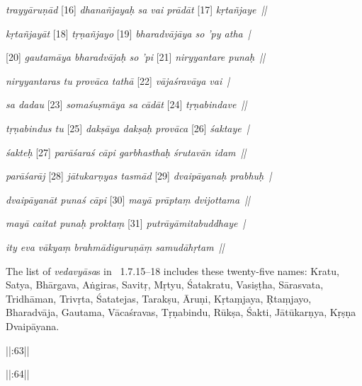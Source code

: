 {{  \textit{trayyāruṇād }[16]\textit{ dhanañjayaḥ sa vai prādāt }[17]\textit{ kṛtañjaye~|| } 
 
  \textit{kṛtañjayāt }[18]\textit{ tṛṇañjayo }[19]\textit{ bharadvājāya so 'py atha~| } 
 
  [20]\textit{ gautamāya bharadvājaḥ so 'pi }[21]\textit{ niryyantare punaḥ~|| } 
 
  \textit{niryyantaras tu provāca tathā }[22]\textit{ vājaśravāya vai~| } 
 
  \textit{sa dadau }[23]\textit{ somaśuṣmāya sa cādāt }[24]\textit{ tṛṇabindave~|| } 
 
  \textit{tṛṇabindus tu }[25]\textit{ dakṣāya dakṣaḥ provāca }[26]\textit{ śaktaye~| } 
 
  \textit{śakteḥ }[27]\textit{ parāśaraś cāpi garbhasthaḥ śrutavān idam~|| } 
 
  \textit{parāśarāj }[28]\textit{ jātukarṇyas tasmād }[29]\textit{ dvaipāyanaḥ prabhuḥ~| } 
 
  \textit{dvaipāyanāt punaś cāpi }[30]\textit{ mayā prāptaṃ dvijottama~|| } 
 
  \textit{mayā caitat punaḥ proktaṃ }[31]\textit{ putrāyāmitabuddhaye~| } 
 
  \textit{ity eva vākyaṃ brahmādiguruṇāṃ samudāhṛtam~||} 
 
  
 
  The list of \textit{vedavyāsa}s in \LINPU\ 1.7.15--18 includes these twenty-five names:
  Kratu, Satya, Bhārgava, Aṅgiras, Savitṛ,
  Mṛtyu, Śatakratu, Vasiṣṭha, Sārasvata, Tridhāman,
  Trivṛta, Śatatejas, Tarakṣu, Āruṇi, Kṛtaṃjaya,
  Ṛtaṃjayo, Bharadvāja, Gautama, Vācaśravas, Tṛṇabindu,
  Rūkṣa, Śakti, Jātūkarṇya, Kṛṣṇa Dvaipāyana.
 }}


  ||:63\thinspace||%


  ||:64\thinspace||%

